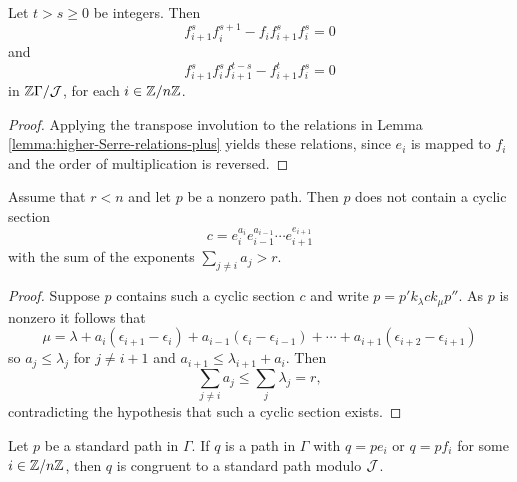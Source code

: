 \documentclass[a4paper, 11pt, twoside]{report}
\begin{document}
\begin{corollary}\label{corollary:higher-Serre-relations-minus}
Let $t>s\geq 0$ be integers. Then
\begin{equation*}
f_{i+1}^s f_i^{s+1} - f_i f_{i+1}^s f_i^s = 0
\end{equation*}
and
\begin{equation*}
f_{i+1}^s f_i^s f_{i+1}^{t-s} - f_{i+1}^t f_i^s = 0
\end{equation*}
in $\mathbb{Z}\Gamma/{\mathcal{J}}$, for each $i\in\mathbb{Z}/{n \mathbb{Z}}$.
\end{corollary}

\begin{proof}
Applying the transpose involution to the relations in Lemma \ref{lemma:higher-Serre-relations-plus} yields these relations, since $e_i$ is mapped to $f_i$ and the order of multiplication is reversed.
\end{proof}

\begin{lemma}\label{lemma:breaking-the-cycle}
Assume that $r<n$ and let $p$ be a nonzero path. Then $p$ does not contain a cyclic section
\begin{equation*}
c = e_i^{a_i}e_{i-1}^{a_{i-1}}\cdots e_{i+1}^{e_{i+1}}
\end{equation*}
with the sum of the exponents $\sum_{j\neq i} a_j >r$.
\end{lemma}

\begin{proof}
Suppose $p$ contains such a cyclic section $c$ and write $p=p'k_\lambda c k_\mu p''$. As $p$ is nonzero it follows that
\begin{equation*}
\mu = \lambda +a_i(\epsilon_{i+1}-\epsilon_i) +a_{i-1}(\epsilon_i -\epsilon_{i-1})+\cdots +a_{i+1}(\epsilon_{i+2}-\epsilon_{i+1})
\end{equation*}
so $a_j\le \lambda_j$ for $j\neq i+1$ and $a_{i+1}\le\lambda_{i+1} +a_i$. Then
\begin{equation*}
\sum_{j\neq i} a_j \le \sum_{j} \lambda_j = r,
\end{equation*}
contradicting the hypothesis that such a cyclic section exists.
\end{proof}

\begin{conjecture}\label{conjecture:extending-standard-paths}
Let $p$ be a standard path in $\Gamma$. If $q$ is a path in $\Gamma$ with $q=pe_i$ or $q=pf_i$ for some $i\in\mathbb{Z}/{n \mathbb{Z}}$, then $q$ is congruent to a standard path modulo $\mathcal{J}$.
\end{conjecture}
\end{document}
